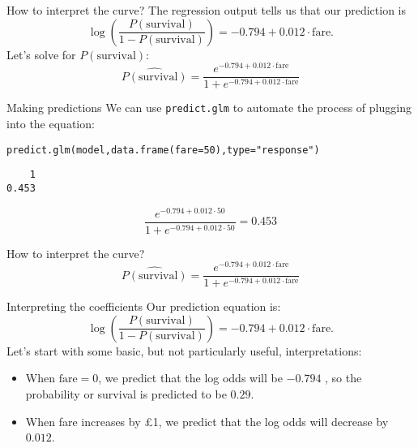 \documentclass{beamer}\usepackage[]{graphicx}\usepackage[]{color}
\makeatletter
\newcommand{\hlnum}[1]{\textcolor[rgb]{0.824,0.412,0.118}{#1}}%
\newcommand{\hlstr}[1]{\textcolor[rgb]{1,0.894,0.71}{#1}}%
\newcommand{\hlstd}[1]{\textcolor[rgb]{1,0.894,0.769}{#1}}%
\newcommand{\hlkwc}[1]{\textcolor[rgb]{0.78,0.941,0.545}{#1}}%
\newcommand{\hlkwd}[1]{\textcolor[rgb]{1,0.78,0.769}{#1}}%
\newenvironment{kframe}{%
 \def\at@end@of@kframe{}%
 \ifinner\ifhmode%
  \def\at@end@of@kframe{\end{minipage}}%
  \begin{minipage}{\columnwidth}%
 \fi\fi%
 \def\FrameCommand##1{\hskip\@totalleftmargin \hskip-\fboxsep
 \colorbox{shadecolor}{##1}\hskip-\fboxsep
     \hskip-\linewidth \hskip-\@totalleftmargin \hskip\columnwidth}%
 \MakeFramed {\advance\hsize-\width
   \@totalleftmargin\z@ \linewidth\hsize
   \@setminipage}}%
 {\par\unskip\endMakeFramed%
 \at@end@of@kframe}
\newenvironment{knitrout}{}{} %
\makeatother
\begin{document}
\begin{darkframes}
\begin{frame}{How to interpret the curve?}
      The regression output tells us that our prediction is
      \[
        \log\left(\frac{P(\text{survival})}{1-P(\text{survival})}\right) = -0.794 + 0.012\cdot\text{fare}.
      \]
      \pause
      Let's solve for $P(\text{survival})$:
      \[
        \widehat{P(\text{survival})} = \frac{e^{-0.794 + 0.012\cdot\text{fare}}}{1 + e^{-0.794 + 0.012\cdot\text{fare}}}
      \]
      \lc
    \end{frame}

    \begin{frame}[fragile]{Making predictions}
      We can use \texttt{predict.glm} to automate the process of plugging into the equation:
\begin{knitrout}
\begin{kframe}
\begin{alltt}
\hlkwd{predict.glm}\hlstd{(model,} \hlkwd{data.frame}\hlstd{(}\hlkwc{fare}\hlstd{=}\hlnum{50}\hlstd{),} \hlkwc{type}\hlstd{=}\hlstr{"response"}\hlstd{)}
\end{alltt}
\begin{verbatim}
    1 
0.453 
\end{verbatim}
\end{kframe}
\end{knitrout}
      
      \[
        \frac{e^{-0.794 + 0.012\cdot 50}}{1 + e^{-0.794 + 0.012\cdot 50}} = 0.453
      \]
    \end{frame}

    \begin{frame}[fragile]{How to interpret the curve?}
      \[
        \widehat{P(\text{survival})} = \frac{e^{-0.794 + 0.012\cdot\text{fare}}}{1 + e^{-0.794 + 0.012\cdot\text{fare}}}
      \]
\begin{knitrout}


\end{knitrout}
    \end{frame}

    \begin{frame}{Interpreting the coefficients}
      Our prediction equation is:
      \[
        \log\left(\frac{P(\text{survival})}{1-P(\text{survival})}\right) = -0.794 + 0.012\cdot\text{fare}.
      \]
      Let's start with some basic, but not particularly useful, interpretations:
      \begin{itemize}[<+->]
        \item When $\text{fare}=0$, we predict that the log odds will be $-0.794$ \pause, so the probability or survival is predicted to be $0.29$.
        \item When fare increases by \pounds 1, we predict that the log odds will decrease by $0.012$.
      \end{itemize}
    \end{frame}


\end{darkframes}
\end{document}
